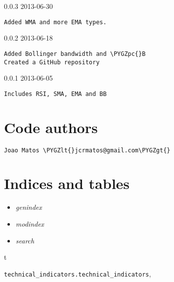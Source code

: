 \documentclass[letterpaper,10pt,english]{sphinxmanual}
\def\PYGZlt{\char`\<}
\def\PYGZgt{\char`\>}
\def\PYGZpc{\char`\%}
\begin{document}
0.0.3 2013-06-30

\begin{Verbatim}[commandchars=\\\{\}]
Added WMA and more EMA types.
\end{Verbatim}

0.0.2 2013-06-18

\begin{Verbatim}[commandchars=\\\{\}]
Added Bollinger bandwidth and \PYGZpc{}B
Created a GitHub repository
\end{Verbatim}

0.0.1 2013-06-05

\begin{Verbatim}[commandchars=\\\{\}]
Includes RSI, SMA, EMA and BB
\end{Verbatim}


\chapter{Code authors}
\label{codeauthors:code-authors}\label{codeauthors::doc}
\begin{Verbatim}[commandchars=\\\{\}]
Joao Matos \PYGZlt{}jcrmatos@gmail.com\PYGZgt{}
\end{Verbatim}


\chapter{Indices and tables}
\label{index:indices-and-tables}\begin{itemize}
\item {} 
\emph{genindex}

\item {} 
\emph{modindex}

\item {} 
\emph{search}

\end{itemize}


\renewcommand{\indexname}{Python Module Index}
\begin{theindex}
\def\bigletter#1{{\Large\sffamily#1}\nopagebreak\vspace{1mm}}
\bigletter{t}
\item {\texttt{technical\_indicators.technical\_indicators}}, \pageref{reference:module-technical_indicators.technical_indicators}
\end{theindex}

\renewcommand{\indexname}{Index}
\printindex
\end{document}
